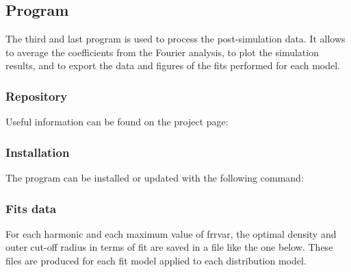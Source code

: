 \subsection{Program}

The third and last program is used to process the post-simulation data.
It allows to average the coefficients from the Fourier analysis, to plot the simulation results, and to export the data and figures of the fits performed for each model.

\subsubsection{Repository}

Useful information can be found on the project page: 

\subsubsection{Installation}

The program can be installed or updated with the following command:


\subsubsection{Fits data}

For each harmonic and each maximum value of \gls{frrvar}, the optimal density and outer cut-off radius in terms of fit are saved in a file like the one below. These files are produced for each fit model applied to each distribution model.

\medskip


